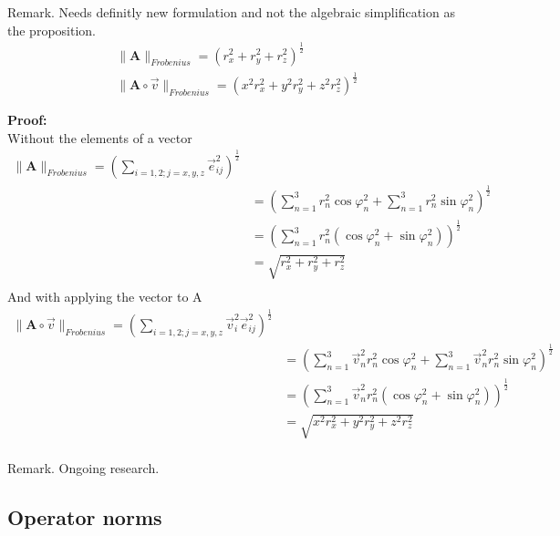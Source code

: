\documentclass[a4paper]{article}
\begin{document}
\begin{Example}
\begin{PropositionMatrixNorm}
Remark. Needs definitly new formulation and not the algebraic simplification as the proposition.\\

\begin{displaymath}
\begin{align}
\|\boldsymbol{A}\|_{Frobenius} = (r_{x}^{2}+r_{y}^{2}+r_{z}^{2})^{\frac{1}{2}}\\
\|\boldsymbol{A}\circ\vec{v}\|_{Frobenius} = (x^{2}r_{x}^{2}+y^{2}r_{y}^{2}+z^{2}r_{z}^{2})^{\frac{1}{2}}
\end{align}
\end{displaymath}
\end{PropositionMatrixNorm}

\textbf{Proof:}\\
Without the elements of a vector 
\begin{displaymath}
\begin{align}
\|\boldsymbol{A}\|_{Frobenius} = (\sum_{i=1,2;j=x,y,z}\vec{e}_{ij}^{2})^{\frac{1}{2}} \\
&= (\sum_{n=1}^{3}r_{n}^{2}\cos\varphi_n^{2} + \sum_{n=1}^{3}r_{n}^{2}\sin\varphi_n^{2})^{\frac{1}{2}}\\
&= (\sum_{n=1}^{3}r_{n}^{2}(\cos\varphi_n^{2} + \sin\varphi_n^{2}))^{\frac{1}{2}}\\
&= \sqrt{r_{x}^{2}+r_{y}^{2}+r_{z}^{2}}\\
\end{align}
\end{displaymath}
And with applying the vector to A
\begin{displaymath}
\begin{align}
\|\boldsymbol{A}\circ\vec{v}\|_{Frobenius} = (\sum_{i=1,2;j=x,y,z}\vec{v}_{i}^{2}\vec{e}_{ij}^{2})^{\frac{1}{2}} \\
&= (\sum_{n=1}^{3}\vec{v}_{n}^{2}r_{n}^{2}\cos\varphi_n^{2} + \sum_{n=1}^{3}\vec{v}_{n}^{2}r_{n}^{2}\sin\varphi_n^{2})^{\frac{1}{2}}\\
&= (\sum_{n=1}^{3}\vec{v}_{n}^{2}r_{n}^{2}(\cos\varphi_n^{2} + \sin\varphi_n^{2}))^{\frac{1}{2}}\\
&= \sqrt{x^{2}r_{x}^{2}+y^{2}r_{y}^{2}+z^{2}r_{z}^{2}}\\
\end{align}
\end{displaymath}

Remark. Ongoing research.



\subsection{Operator norms}


\end{Example}
\end{document}
